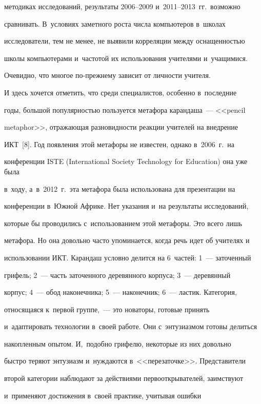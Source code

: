 методиках исследований, результаты 2006--2009 и~2011--2013~гг.\ возможно 


сравнивать. В~условиях заметного роста числа компьютеров в~школах 


исследователи, тем не менее, не выявили корреляции между оснащенностью 


школы компьютерами и~частотой их использования учителями и~учащимися. 


Очевидно, что многое по-прежнему зависит от личности учителя.


  


  И здесь хочется отметить, что среди специалистов, особенно в~последние 


годы, большой популярностью пользуется метафора карандаша~--- <<pencil 


metaphor>>, отражающая разновидности реакции учителей на внедрение 


ИКТ~[8]. Год появления этой метафоры не известен, однако в~2006~г.\ на 


конференции ISTE (International Society Technology for Education) она уже была 


в~ходу, а~в~2012~г.\ эта метафора была использована для презентации на 


конференции в~Южной Африке. Нет указания и~на результаты исследований, 


которые бы проводились с~использованием этой метафоры. Это всего лишь 


метафора. Но она довольно час\-то упоминается, когда речь идет об учителях и~


использовании ИКТ. Карандаш условно делится на 6~частей: 1~--- заточенный 


грифель; 2~--- часть заточенного деревянного корпуса; 3~--- деревянный 


корпус; 4~--- обод наконечника; 5~--- наконечник; 6~--- ластик. Категория, 


относящаяся к~первой группе,~--- это новаторы, готовые принять 


и~адаптировать технологии в~своей работе. Они с~энтузиазмом готовы делиться 


накопленным опытом. И,~подобно грифелю, некоторые из них довольно 


быстро теряют энтузиазм и~нуждаются в~<<перезаточке>>. Представители 


второй категории наблюдают за действиями первооткрывателей, заимствуют 


и~применяют достижения в~своей практике, учитывая ошибки 



